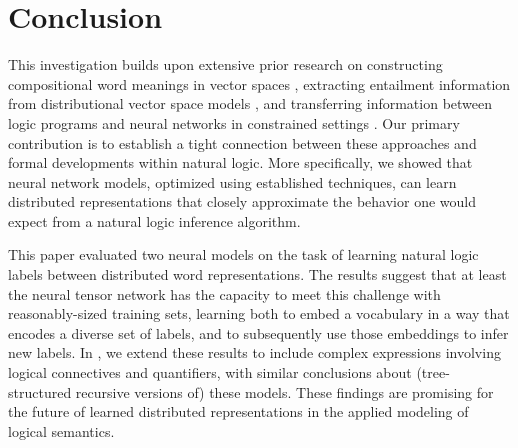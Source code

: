 \documentclass[letterpaper]{article}
\begin{document}
\section{Conclusion}\label{sec:discussion}

This investigation builds upon extensive prior research on
constructing compositional word meanings in vector spaces
\cite{ClarkCoeckeSadrzadeh2011,grefenstette2013towards,Hermann-etal:2013,rocktaschellow},
extracting entailment information from distributional vector space
models \cite{baroni2012entailment,rei2014looking}, and transferring
information between logic programs and neural networks in constrained
settings \cite{hitzler2004logic,holldobler1999approximating}. Our
primary contribution is to establish a tight connection between these
approaches and formal developments within natural logic.  More
specifically, we showed that neural network models, optimized using
established techniques, can learn distributed representations that
closely approximate the behavior one would expect from a natural logic
inference algorithm.


This paper evaluated two neural models on the task of learning 
natural logic labels between distributed word representations. The
results suggest that at least the neural tensor network
has the capacity to
meet this challenge with reasonably-sized training sets, learning both 
to embed a vocabulary in a way that encodes a diverse
set of labels, and to subsequently use those embeddings to infer new
labels. In
\cite{Bowman:Potts:Manning:2014}, we extend these results to include
complex expressions involving logical connectives and quantifiers, with similar
conclusions about (tree-structured recursive versions of) these models. These findings
are promising for the future of learned distributed representations in the
applied modeling of logical semantics.
\end{document}
